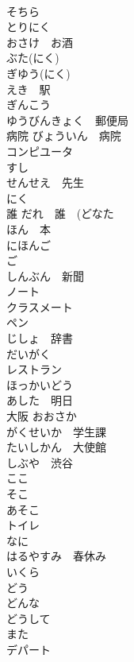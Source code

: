 \documentclass[8pt]{extreport}
\begin{document}
\begin{CJK}{UTF8}{min}
\\	そちら
\\	とりにく
\\	おさけ　お酒
\\	ぶた(にく)
\\	ぎゆう(にく) 
\\	えき　駅
\\	ぎんこう
\\	ゆうびんきょく　郵便局
\\	病院	びょういん　病院
\\	コンピユータ　
\\	すし
\\	せんせえ　先生
\\	にく
\\	誰	だれ　誰　(どなた
\\	ほん　本
\\	にほんご
\\	ご
\\	しんぶん　新聞
\\	ノート　
\\	クラスメート　
\\	ペン
\\	じしょ　辞書
\\	だいがく
\\	レストラン　
\\	ほっかいどう
\\	あした　明日
\\	大阪	おおさか
\\	がくせいか　学生課
\\	たいしかん　大使館
\\	しぶや　渋谷
\\	ここ
\\	そこ
\\	あそこ
\\	トイレ　
\\	なに
\\	はるやすみ　春休み
\\	いくら
\\	どう
\\	どんな
\\	どうして
\\	また
\\	デパート　
\end{CJK}
\end{document}
